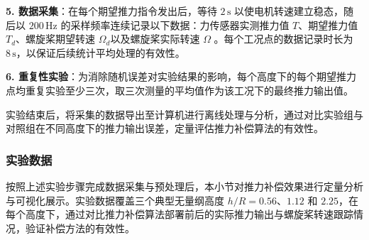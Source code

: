 \textbf{5. 数据采集}：在每个期望推力指令发出后，等待 \(2\,\mathrm{s}\) 以使电机转速建立稳态，随后以 \(200\,\mathrm{Hz}\) 的采样频率连续记录以下数据：力传感器实测推力值 \(T\)、期望推力值 \(T_d\)、螺旋桨期望转速 \(\Omega_d\)以及螺旋桨实际转速 \(\Omega\) 。每个工况点的数据记录时长为 \(8\,\mathrm{s}\)，以保证后续统计平均处理的有效性。
    
\textbf{6. 重复性实验}：为消除随机误差对实验结果的影响，每个高度下的每个期望推力点均重复实验至少三次，取三次测量的平均值作为该工况下的最终推力输出值。


实验结束后，将采集的数据导出至计算机进行离线处理与分析，通过对比实验组与对照组在不同高度下的推力输出误差，定量评估推力补偿算法的有效性。



\subsubsection{实验数据}

按照上述实验步骤完成数据采集与预处理后，本小节对推力补偿效果进行定量分析与可视化展示。实验数据覆盖三个典型无量纲高度 \(h/R = 0.56\)、\(1.12\) 和 \(2.25\)，在每个高度下，通过对比推力补偿算法部署前后的实际推力输出与螺旋桨转速跟踪情况，验证补偿方法的有效性。


